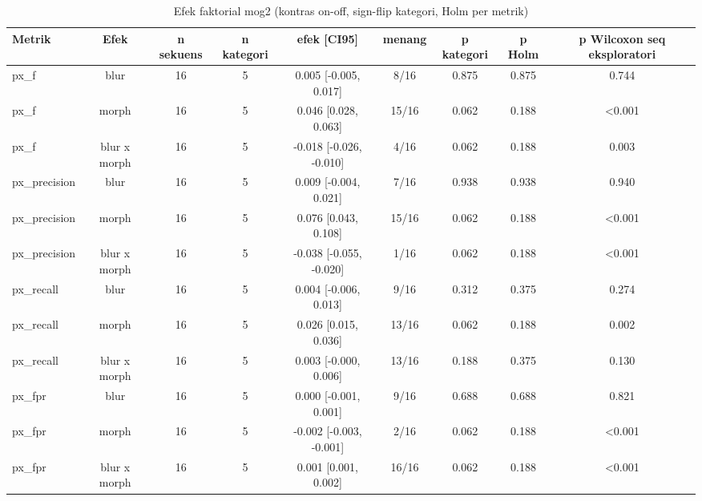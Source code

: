 \begin{table}[t]
\centering
\caption{Efek faktorial mog2 (kontras on-off, sign-flip kategori, Holm per metrik)}
\label{tab:stats_ablation_mog2}
\begin{tabular}{lcccccccc}
\toprule
Metrik & Efek & n sekuens & n kategori & efek [CI95] & menang & p kategori & p Holm & p Wilcoxon seq eksploratori \\
\midrule
px\_f & blur & 16 & 5 & 0.005 [-0.005, 0.017] & 8/16 & 0.875 & 0.875 & 0.744 \\
px\_f & morph & 16 & 5 & 0.046 [0.028, 0.063] & 15/16 & 0.062 & 0.188 & <0.001 \\
px\_f & blur x morph & 16 & 5 & -0.018 [-0.026, -0.010] & 4/16 & 0.062 & 0.188 & 0.003 \\
px\_precision & blur & 16 & 5 & 0.009 [-0.004, 0.021] & 7/16 & 0.938 & 0.938 & 0.940 \\
px\_precision & morph & 16 & 5 & 0.076 [0.043, 0.108] & 15/16 & 0.062 & 0.188 & <0.001 \\
px\_precision & blur x morph & 16 & 5 & -0.038 [-0.055, -0.020] & 1/16 & 0.062 & 0.188 & <0.001 \\
px\_recall & blur & 16 & 5 & 0.004 [-0.006, 0.013] & 9/16 & 0.312 & 0.375 & 0.274 \\
px\_recall & morph & 16 & 5 & 0.026 [0.015, 0.036] & 13/16 & 0.062 & 0.188 & 0.002 \\
px\_recall & blur x morph & 16 & 5 & 0.003 [-0.000, 0.006] & 13/16 & 0.188 & 0.375 & 0.130 \\
px\_fpr & blur & 16 & 5 & 0.000 [-0.001, 0.001] & 9/16 & 0.688 & 0.688 & 0.821 \\
px\_fpr & morph & 16 & 5 & -0.002 [-0.003, -0.001] & 2/16 & 0.062 & 0.188 & <0.001 \\
px\_fpr & blur x morph & 16 & 5 & 0.001 [0.001, 0.002] & 16/16 & 0.062 & 0.188 & <0.001 \\
\bottomrule
\end{tabular}
\end{table}
